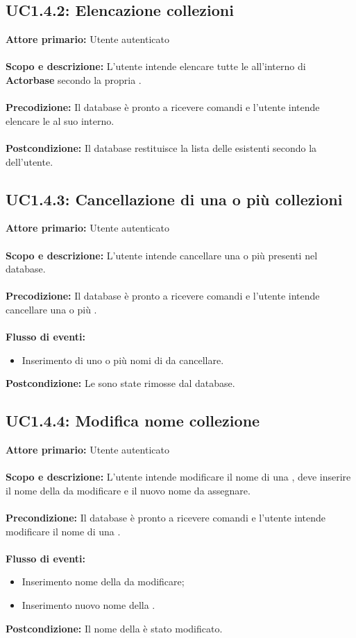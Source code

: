 \documentclass{scalatekids-article}
\begin{document}
\subsection{UC1.4.2: Elencazione collezioni}
\textbf{Attore primario:} Utente autenticato\\ \\
\textbf{Scopo e descrizione:} L'utente intende elencare tutte le  all'interno di \textbf{Actorbase} secondo la propria .\\ \\
\textbf{Precodizione:} Il database è pronto a ricevere comandi e l'utente intende elencare le  al suo interno.\\ \\
\textbf{Postcondizione:} Il database restituisce la lista delle  esistenti secondo la  dell'utente.
\subsection{UC1.4.3: Cancellazione di una o più collezioni}
\textbf{Attore primario:} Utente autenticato\\ \\
\textbf{Scopo e descrizione:} L’utente intende cancellare una o più  presenti nel database.\\ \\
\textbf{Precodizione:} Il database è pronto a ricevere comandi e l’utente intende cancellare una o più .\\ \\
\textbf{Flusso di eventi:}
\begin{itemize}
\item Inserimento di uno o più nomi di  da cancellare.
\end{itemize}
\textbf{Postcondizione:} Le  sono state rimosse dal database.
\subsection{UC1.4.4: Modifica nome collezione}
\textbf{Attore primario:} Utente autenticato \\ \\
\textbf{Scopo e descrizione:} L’utente intende modificare il nome di una , deve inserire il nome della  da modificare e il nuovo nome da assegnare. \\ \\
\textbf{Precondizione:} Il database è pronto a ricevere comandi e l’utente intende modificare il nome di una .\\ \\
\textbf{Flusso di eventi:}
\begin{itemize}
\item Inserimento nome della  da modificare;
\item Inserimento nuovo nome della .
\end{itemize}
\textbf{Postcondizione:} Il nome della  è stato modificato.
\end{document}
